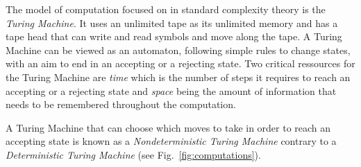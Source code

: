 The model of computation focused on in standard complexity theory is the \textit{Turing Machine}. It uses an unlimited tape as its unlimited memory
and has a tape head that can write and read symbols and move along the tape. A Turing Machine can be viewed as an automaton, following simple rules
to change states, with an aim to end in an accepting or a rejecting state. Two critical ressources for the Turing Machine are \textit{time} which is
the number of steps it requires to reach an accepting or a rejecting state and \textit{space} being the amount of information that needs to be
remembered throughout the computation.

A Turing Machine that can choose which moves to take in order to reach an accepting state is known as a \textit{Nondeterministic Turing Machine}
contrary to a \textit{Deterministic Turing Machine} (see Fig.~\ref{fig:computations}).
